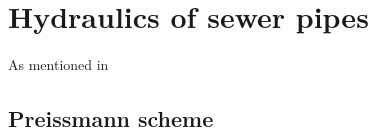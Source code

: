 \section{Hydraulics of sewer pipes}\label{se:hydraulics_of_sewer_pipes}

As mentioned in 



\subsection{Preissmann scheme}\label{subse:preissmann_scheme}



